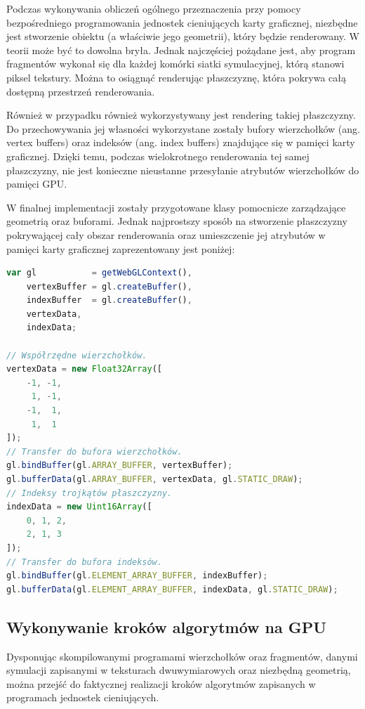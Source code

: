 Podczas wykonywania obliczeń ogólnego przeznaczenia przy pomocy bezpośredniego
programowania jednostek cieniujących karty graficznej, niezbędne jest
stworzenie obiektu (a właściwie jego geometrii), który będzie renderowany. W
teorii może być to dowolna bryła. Jednak najczęściej pożądane jest, aby
program fragmentów wykonał się dla każdej komórki siatki symulacyjnej, którą
stanowi piksel tekstury. Można to osiągnąć renderując płaszczyznę, która
pokrywa całą dostępną przestrzeń renderowania.

Również w przypadku \en również wykorzystywany jest rendering takiej
płaszczyzny. Do przechowywania jej własności wykorzystane zostały bufory
wierzchołków (ang. vertex buffers) oraz indeksów (ang. index buffers)
znajdujące się w pamięci karty graficznej. Dzięki temu, podczas wielokrotnego
renderowania tej samej płaszczyzny, nie jest konieczne nieustanne przesyłanie
atrybutów wierzchołków do pamięci GPU.

W finalnej implementacji \en zostały przygotowane klasy pomocnicze
zarządzające geometrią oraz buforami. Jednak najprostszy sposób na stworzenie
płaszczyzny pokrywającej cały obszar renderowania oraz umieszczenie jej
atrybutów w pamięci karty graficznej zaprezentowany jest poniżej:

\begin{lstlisting}[language=JavaScript, caption=Definicja geometrii
płaszczyzny pokrywającej cały obszar renderowania]
var gl           = getWebGLContext(),
    vertexBuffer = gl.createBuffer(),
    indexBuffer  = gl.createBuffer(),
    vertexData,
    indexData;

// Współrzędne wierzchołków.
vertexData = new Float32Array([
    -1, -1, 
     1, -1,
    -1,  1,
     1,  1
]);
// Transfer do bufora wierzchołków.
gl.bindBuffer(gl.ARRAY_BUFFER, vertexBuffer);
gl.bufferData(gl.ARRAY_BUFFER, vertexData, gl.STATIC_DRAW);
// Indeksy trojkątów płaszczyzny.
indexData = new Uint16Array([
    0, 1, 2,
    2, 1, 3
]);
// Transfer do bufora indeksów.
gl.bindBuffer(gl.ELEMENT_ARRAY_BUFFER, indexBuffer);
gl.bufferData(gl.ELEMENT_ARRAY_BUFFER, indexData, gl.STATIC_DRAW);
\end{lstlisting}

\subsection{Wykonywanie kroków algorytmów na GPU}
\label{sec:wykonNaGPU}

Dysponując skompilowanymi programami wierzchołków oraz fragmentów, danymi
symulacji zapisanymi w teksturach dwuwymiarowych oraz niezbędną geometrią,
można przejść do faktycznej realizacji kroków algorytmów
zapisanych w programach jednostek cieniujących.

